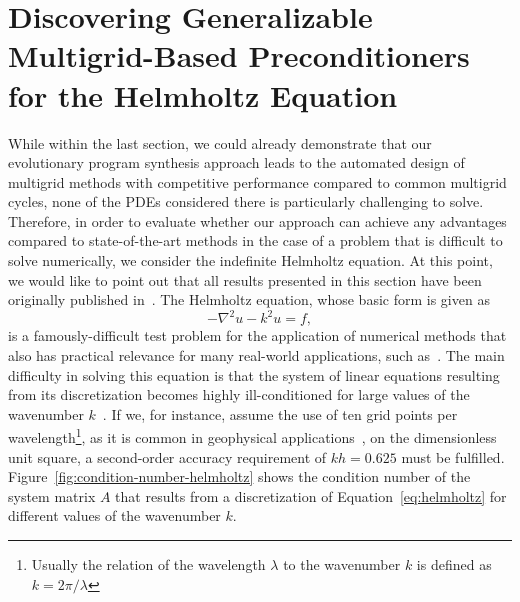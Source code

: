 \section{Discovering Generalizable Multigrid-Based Preconditioners for the Helmholtz Equation}
While within the last section, we could already demonstrate that our evolutionary program synthesis approach leads to the automated design of multigrid methods with competitive performance compared to common multigrid cycles, none of the PDEs considered there is particularly challenging to solve.   
Therefore, in order to evaluate whether our approach can achieve any advantages compared to state-of-the-art methods in the case of a problem that is difficult to solve numerically, we consider the indefinite Helmholtz equation.
At this point, we would like to point out that all results presented in this section have been originally published in~\cite{schmitt2022evolving}.
The Helmholtz equation, whose basic form is given as 
\begin{equation}
	-\nabla ^{2}u - k^{2}u = f,
	\label{eq:helmholtz}
\end{equation} 
is a famously-difficult test problem for the application of numerical methods that also has practical relevance for many real-world applications, such as~\cite{versteeg1994marmousi,martin2006marmousi2,billette20052004,gray1995migration}.
The main difficulty in solving this equation is that the system of linear equations resulting from its discretization becomes highly ill-conditioned for large values of the wavenumber $k$~\cite{ernst2012difficult}.
If we, for instance, assume the use of ten grid points per wavelength\footnote{Usually the relation of the wavelength $\lambda$ to the wavenumber $k$ is defined as $k = 2 \pi/\lambda$ }, as it is common in geophysical applications~\cite{erlangga2006multigrid}, on the dimensionless unit square, a second-order accuracy requirement of $kh = 0.625$ must be fulfilled.
Figure~\ref{fig:condition-number-helmholtz} shows the condition number of the system matrix $A$ that results from a discretization of Equation~\eqref{eq:helmholtz} for different values of the wavenumber $k$.
